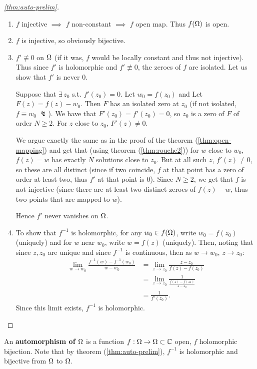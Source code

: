 \begin{proof}[\ref{thm:auto-prelim}]
\begin{enumerate}
    \item $f$ injective $\implies$ $f$ non-constant $\implies$ $f$ open map. Thus $f(\Omega)$ is open.
    \item $f$ is injective, so obviously bijective.
    \item $f' \nequiv 0$ on $\Omega$ (if it was, $f$ would be locally constant and thus not injective). Thus since $f'$ is holomorphic and $f' \nequiv 0$, the zeroes of $f$ are isolated. Let us show that $f'$ is never $0$.
    
    Suppose that $\exists \, z_0$ s.t. $f'(z_0) = 0$. Let $w_0 = f(z_0)$ and Let $F(z) = f(z) - w_0$. Then $F$ has an isolated zero at $z_0$ (if not isolated, $f \equiv w_0 \; \lightning$). We have that $F'(z_0) = f'(z_0) = 0$, so $z_0$ is a zero of $F$ of order $N \geq 2$. For $z$ close to $z_0$, $F'(z) \neq 0$.
    
    We argue exactly the same as in the proof of the theorem (\ref{thm:open-mapping}) and get that (using theorem (\ref{thm:rouche2})) for $w$ close to $w_0$, $f(z) = w$ has exactly $N$ solutions close to $z_0$. But at all such $z$, $f'(z) \neq 0$, so these are all distinct (since if two coincide, $f$ at that point has a zero of order at least two, thus $f'$ at that point is 0). Since $N\geq 2$, we get that $f$ is not injective (since there are at least two distinct zeroes of $f(z) - w$, thus two points that are mapped to $w$).
    
    Hence $f'$ never vanishes on $\Omega$.
    \item To show that $f^{-1}$ is holomorphic, for any $w_0 \in f(\Omega)$, write $w_0 = f(z_0)$ (uniquely) and for $w$ near $w_0$, write $w = f(z)$ (uniquely). Then, noting that since $z,z_0$ are unique and since $f^{-1}$ is continuous, then as $w \to w_0$, $z \to z_0$:
    \begin{align*}
        \lim_{w \to w_0}\frac{f^{-1} (w) - f^{-1} (w_0)  }{w-w_0} &= \lim_{z \to z_0} \frac{z-z_0}{f(z) - f(z_0)}\\
        &= \lim_{z \to z_0} \frac{1}{\frac{f(z) - f(z_0)}{z-z_0}}\\
        &= \frac{1}{f'(z_0)}.
    \end{align*}
    Since this limit exists, $f^{-1}$ is holomorphic.
\end{enumerate}
\end{proof}

\begin{definition}[Automorphism]
An \textbf{automorphism of $\Omega$} is a function $f: \Omega \to \Omega \subset \mathbb{C}$ open, $f$ holomorphic bijection. Note that by theorem (\ref{thm:auto-prelim}), $f^{-1}$ is holomorphic and bijective from $\Omega $ to $\Omega$.
\end{definition}

